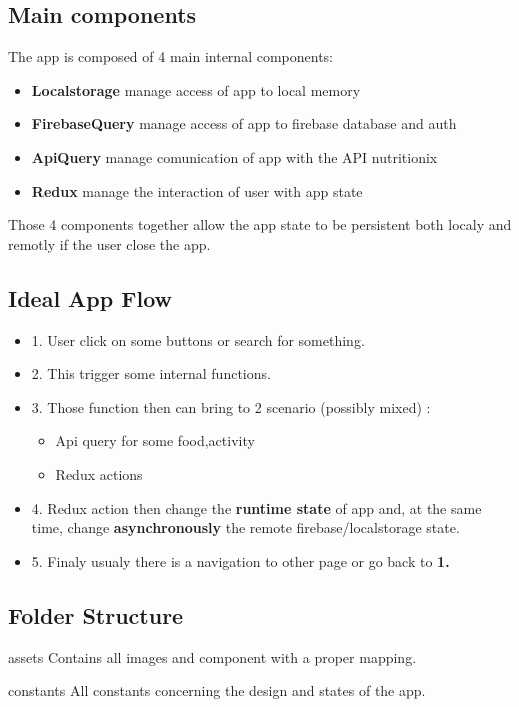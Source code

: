 \documentclass[12pt,hidelinks]{article}
\begin{document}
\subsection{Main components}
The app is composed of 4 main internal components:
\begin{itemize}
	\item \textbf{Localstorage} manage  access of app to local memory
	\item \textbf{FirebaseQuery} manage access of app to firebase database and auth
	\item \textbf{ApiQuery} manage comunication of app with the API nutritionix
	\item \textbf{Redux} manage the interaction of user with app state
\end{itemize}
Those 4 components together allow the app state to be persistent both localy and remotly if the user close the app.
\subsection{Ideal App Flow}
	\begin{itemize}
		\item 1. User click on some buttons or search for something.
		\item 2. This trigger some internal functions.
		\item 3. Those function then can bring to 2 scenario (possibly mixed) :
		\begin{itemize}
			\item Api query for some food,activity
   			\item Redux actions
		\end{itemize}
		\item 4. Redux action then change the \textbf{runtime state} of app and, at the same time, change \textbf{asynchronously} the remote firebase/localstorage state.
  		\item 5. Finaly usualy there is a navigation to other page or go back to \textbf{1.}
	\end{itemize}
\subsection{Folder Structure}
	\begin{docCommand}{assets}{}
		Contains all images and component with a proper mapping.
	\end{docCommand}

	\begin{docCommand}{constants}{}
		All constants concerning the design and states of the app.
	\end{docCommand}
\end{document}
